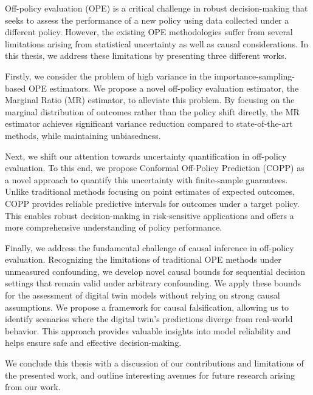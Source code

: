 Off-policy evaluation (OPE) is a critical challenge in robust decision-making that seeks to assess the performance of a new policy using data collected under a different policy. 
%
%
%
However, the existing OPE methodologies suffer from several limitations arising from statistical uncertainty as well as causal considerations. 
In this thesis, we address these limitations by presenting three different works. 

Firstly, we consider the problem of high variance in the importance-sampling-based OPE estimators. 
We propose a novel off-policy evaluation estimator, the Marginal Ratio (MR) estimator, to alleviate this problem.
By focusing on the marginal distribution of outcomes rather than the policy shift directly, the MR estimator achieves significant variance reduction compared to state-of-the-art methods, while maintaining unbiasedness. 
%

Next, we shift our attention towards uncertainty quantification in off-policy evaluation.
To this end, we propose Conformal Off-Policy Prediction (COPP) as a novel approach to quantify this uncertainty with finite-sample guarantees.
Unlike traditional methods focusing on point estimates of expected outcomes, COPP provides reliable predictive intervals for outcomes under a target policy. This enables robust decision-making in risk-sensitive applications and offers a more comprehensive understanding of policy performance. 
%

Finally, we address the fundamental challenge of causal inference in off-policy evaluation. 
Recognizing the limitations of traditional OPE methods under unmeasured confounding, we develop novel causal bounds for sequential decision settings that remain valid under arbitrary confounding.
We apply these bounds for the assessment of digital twin models without relying on strong causal assumptions. 
We propose a framework for causal falsification, allowing us to identify scenarios where the digital twin's predictions diverge from real-world behavior. This approach provides valuable insights into model reliability and helps ensure safe and effective decision-making.

We conclude this thesis with a discussion of our contributions and
limitations of the presented work, and outline interesting avenues for future research arising from our work.